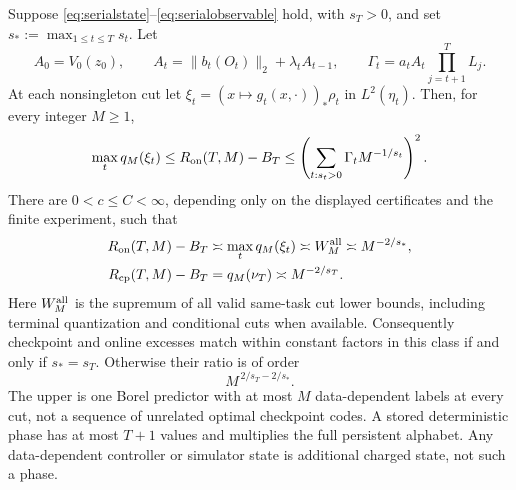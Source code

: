 \begin{theorem}\label{thm:serial}
Suppose \eqref{eq:serialstate}--\eqref{eq:serialobservable} hold, with $s_T>0$, and set $s_*:=\max_{1\le t\le T}s_t$. Let
\[
 A_0=V_0(z_0),\qquad A_t=\|b_t(O_t)\|_2+\lambda_t A_{t-1},\qquad
 \Gamma_t=a_tA_t\prod_{j=t+1}^{T}L_j.
\]
At each nonsingleton cut let
$\xi_t=(x\mapsto g_t(x,\cdot))_*\rho_t$ in $L^2(\eta_t)$.
Then, for every integer $M\ge1$,
\begin{equation}\label{eq:serialexplicit}
 \max_t q_M(\xi_t)\le R_{\mathrm{on}}(T,M)-B_T
 \le \left(\sum_{t:s_t>0}\Gamma_tM^{-1/s_t}\right)^2.
\end{equation}
There are $0<c\le C<\infty$, depending only on the displayed certificates and the finite experiment, such that
\begin{align}
 R_{\mathrm{on}}(T,M)-B_T&\asymp \max_t q_M(\xi_t)\asymp W_M^{\rm all}
                    \asymp M^{-2/s_*},\label{eq:serialrate}\\
 R_{\mathrm{cp}}(T,M)-B_T&=q_M(\nu_T)\asymp M^{-2/s_T}.\label{eq:serialcheckpoint}
\end{align}
Here $W_M^{\rm all}$ is the supremum of all valid same-task cut lower bounds, including terminal quantization and conditional cuts when available. Consequently checkpoint and online excesses match within constant factors in this class if and only if $s_*=s_T$. Otherwise their ratio is of order
\begin{equation}\label{eq:serialratio}
 M^{\,2/s_T-2/s_*}.
\end{equation}
The upper is one Borel predictor with at most $M$ data-dependent labels at every cut, not a sequence of unrelated optimal checkpoint codes. A stored deterministic phase has at most $T+1$ values and multiplies the full persistent alphabet. Any data-dependent controller or simulator state is additional charged state, not such a phase.
\end{theorem}
